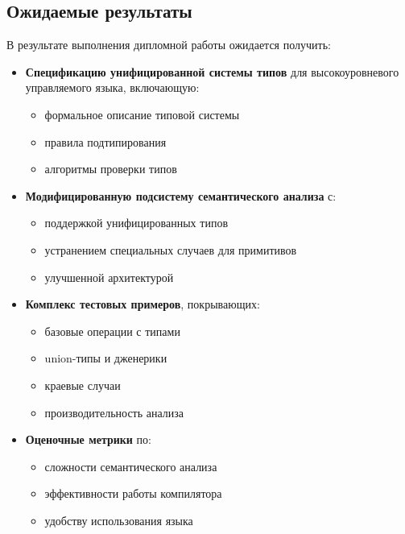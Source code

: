 \subsection{Ожидаемые результаты}
В результате выполнения дипломной работы ожидается получить:

\begin{itemize}
    \item \textbf{Спецификацию унифицированной системы типов} для высокоуровневого управляемого языка, включающую:
    \begin{itemize}
        \item формальное описание типовой системы
        \item правила подтипирования
        \item алгоритмы проверки типов
    \end{itemize}

    \item \textbf{Модифицированную подсистему семантического анализа} с:
    \begin{itemize}
        \item поддержкой унифицированных типов
        \item устранением специальных случаев для примитивов
        \item улучшенной архитектурой
    \end{itemize}

    \item \textbf{Комплекс тестовых примеров}, покрывающих:
    \begin{itemize}
        \item базовые операции с типами
        \item union-типы и дженерики
        \item краевые случаи
        \item производительность анализа
    \end{itemize}

    \item \textbf{Оценочные метрики} по:
    \begin{itemize}
        \item сложности семантического анализа
        \item эффективности работы компилятора
        \item удобству использования языка
    \end{itemize}
\end{itemize}

\newpage
